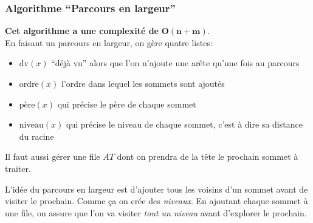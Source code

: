\documentclass[french]{article}
\theoremstyle{definition}
\begin{document}
		\subsubsection{Algorithme ``Parcours en largeur''}
		\textbf{Cet algorithme a une complexité de} $\mathbf{O(n + m)}$.\\
		En faisant un parcours en largeur, on gère quatre listes:
		\begin{itemize}
			\item $\text{dv}(x)$ ``déjà vu'' alors que l'on n'ajoute une arête qu'une fois au parcours
			\item $\text{ordre}(x)$ l'ordre dans lequel les sommets sont ajoutés
			\item $\text{père}(x)$ qui précise le père de chaque sommet
			\item $\text{niveau}(x)$ qui précise le niveau de chaque sommet, c'est à dire sa distance du racine
		\end{itemize}

		Il faut aussi gérer une file $AT$ dont on prendra de la tête le prochain sommet à traiter.
		\\
		\begin{algorithmic}[1]
			\ENDFOR
					\ENDIF
				\ENDFOR
			\ENDWHILE
		\end{algorithmic}

		L'idée du parcours en largeur est d'ajouter tous les voisins d'un sommet avant de visiter le prochain. Comme ça on crée des \textit{niveaux}. En ajoutant chaque sommet à une file, on assure que l'on va visiter \textit{tout un niveau} avant d'explorer le prochain.
\end{document}
